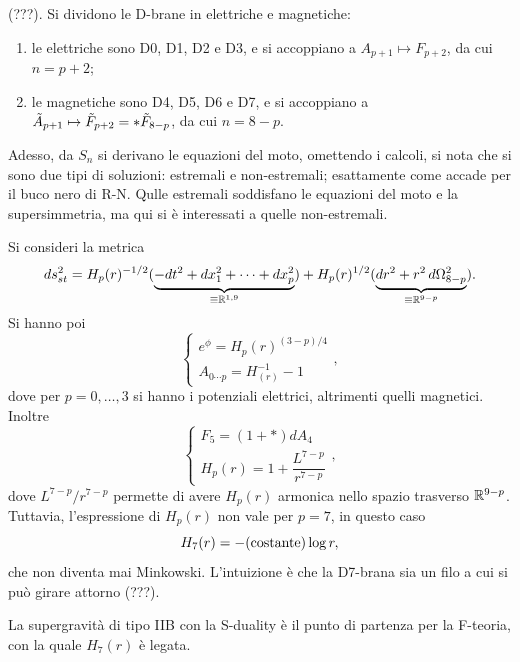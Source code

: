 (???). Si dividono le D-brane in elettriche e magnetiche:
\begin{enumerate}
    \item le elettriche sono D0, D1, D2 e D3, e si accoppiano a $A_{p + 1} \mapsto F_{p + 2}$, da cui $n = p + 2$;
    \item le magnetiche sono D4, D5, D6 e D7, e si accoppiano a $\tilde{A}_{p + 1} \mapsto \tilde{F}_{p + 2} = *\tilde{F}_{8 - p}$, da cui $n = 8 - p$. 
\end{enumerate}
Adesso, da $S_n$ si derivano le equazioni del moto, omettendo i calcoli, si nota che si sono due tipi di soluzioni: estremali e non-estremali; esattamente come accade per il buco nero di R-N. Qulle estremali soddisfano le equazioni del moto e la supersimmetria, ma qui si è interessati a quelle non-estremali. 

Si consideri la metrica 
\begin{equation}
    ds_{st}^2 = H_p(r)^{-1/2}(\underbrace{-dt^2 + dx_1^2 + \cdots + dx_p^2}_{\equiv \mathbb{R}^{1,9}}) + H_p(r)^{1/2}(\underbrace{dr^2 + r^2\,d\Omega^2_{8 - p}}_{\equiv \mathbb{R}^{9 - p}}).
\end{equation}
Si hanno poi 
\begin{equation}
    \begin{cases}
        e^{\phi} = H_p(r)^{(3 - p)/4} \\
        A_{0\cdots p} = H_(r)^{-1} - 1
    \end{cases},
\end{equation}
dove per $p = 0,\dots,3$ si hanno i potenziali elettrici, altrimenti quelli magnetici. Inoltre 
\begin{equation}
    \begin{cases}
        F_5 = (1 + *)dA_4 \\[2ex]
        H_p(r) = 1 + \dfrac{L^{7 - p}}{r^{7 - p}}
    \end{cases},
\end{equation}
dove $L^{7 - p}/r^{7 - p}$ permette di avere $H_p(r)$ armonica nello spazio trasverso $\mathbb{R}^{9 - p}$. Tuttavia, l'espressione di $H_p(r)$ non vale per $p = 7$, in questo caso 
\begin{equation}
    H_7(r) = -(\mathrm{costante})\log{r},
\end{equation}
che non diventa mai Minkowski. L'intuizione è che la D7-brana sia un filo a cui si può girare attorno (???). 
\begin{obs}
    La supergravità di tipo IIB con la S-duality è il punto di partenza per la F-teoria, con la quale $H_7(r)$ è legata. 
\end{obs}
